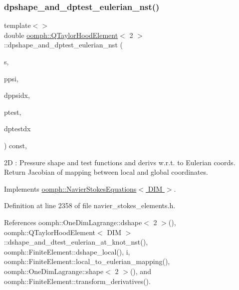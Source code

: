 \subsubsection{\texorpdfstring{dpshape\+\_\+and\+\_\+dptest\+\_\+eulerian\+\_\+nst()}{dpshape\_and\_dptest\_eulerian\_nst()}\hspace{0.1cm}{\footnotesize\ttfamily [2/3]}}
{\footnotesize\ttfamily template$<$$>$ \\
double \hyperlink{classoomph_1_1QTaylorHoodElement}{oomph\+::\+Q\+Taylor\+Hood\+Element}$<$ 2 $>$\+::dpshape\+\_\+and\+\_\+dptest\+\_\+eulerian\+\_\+nst (\begin{DoxyParamCaption}\item[{const \hyperlink{classoomph_1_1Vector}{Vector}$<$ double $>$ \&}]{s,  }\item[{\hyperlink{classoomph_1_1Shape}{Shape} \&}]{ppsi,  }\item[{\hyperlink{classoomph_1_1DShape}{D\+Shape} \&}]{dppsidx,  }\item[{\hyperlink{classoomph_1_1Shape}{Shape} \&}]{ptest,  }\item[{\hyperlink{classoomph_1_1DShape}{D\+Shape} \&}]{dptestdx }\end{DoxyParamCaption}) const\hspace{0.3cm}{\ttfamily [inline]}, {\ttfamily [virtual]}}

2D \+: Pressure shape and test functions and derivs w.\+r.\+t. to Eulerian coords. Return Jacobian of mapping between local and global coordinates. 

Implements \hyperlink{classoomph_1_1NavierStokesEquations_a2f3024a4d370ec45ddffacb236bc2bb2}{oomph\+::\+Navier\+Stokes\+Equations$<$ D\+I\+M $>$}.



Definition at line 2358 of file navier\+\_\+stokes\+\_\+elements.\+h.



References oomph\+::\+One\+Dim\+Lagrange\+::dshape$<$ 2 $>$(), oomph\+::\+Q\+Taylor\+Hood\+Element$<$ D\+I\+M $>$\+::dshape\+\_\+and\+\_\+dtest\+\_\+eulerian\+\_\+at\+\_\+knot\+\_\+nst(), oomph\+::\+Finite\+Element\+::dshape\+\_\+local(), i, oomph\+::\+Finite\+Element\+::local\+\_\+to\+\_\+eulerian\+\_\+mapping(), oomph\+::\+One\+Dim\+Lagrange\+::shape$<$ 2 $>$(), and oomph\+::\+Finite\+Element\+::transform\+\_\+derivatives().

\mbox{\label{classoomph_1_1QTaylorHoodElement_ab6e02c9be9e94608bd54b1afe1434d10}} 
